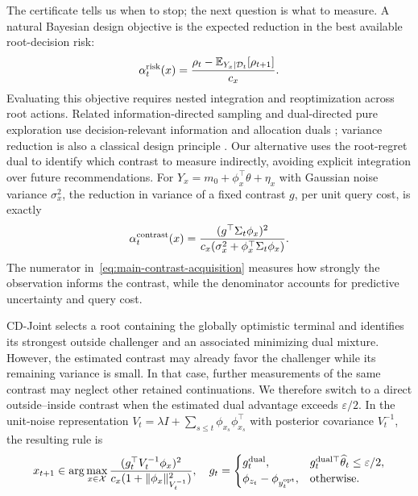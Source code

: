 \documentclass{article}
\theoremstyle{plain}
\theoremstyle{definition}
\begin{document}
The certificate tells us when to stop; the next question is
what to measure. A natural Bayesian design objective is the
expected reduction in the best available root-decision risk:
\begin{equation}
 \alpha_t^{\rm risk}(x)
 =\frac{\rho_t-\mathbb E_{Y_x\mid\mathcal D_t}
 [\rho_{t+1}]}{c_x}.
 \label{eq:main-risk-acquisition}
\end{equation}
Evaluating this objective requires nested integration and
reoptimization across root actions. Related information-directed
sampling and dual-directed pure exploration use decision-relevant
information and allocation duals
\citep{russo2018ids,kirschner2020ids,qin2026dual};
variance reduction is also a classical design principle
\citep{bogunovic2016truvar}. Our alternative uses the root-regret
dual to identify which contrast to measure indirectly, avoiding
explicit integration over future recommendations.
For $Y_x=m_0+\phi_x^\top\theta+\eta_x$ with Gaussian noise
variance $\sigma_x^2$, the reduction in variance of a fixed
contrast $g$, per unit query cost, is exactly
\begin{equation}
 \alpha_t^{\rm contrast}(x)
 =\frac{(g^\top\Sigma_t\phi_x)^2}
 {c_x(\sigma_x^2+\phi_x^\top\Sigma_t\phi_x)}.
 \label{eq:main-contrast-acquisition}
\end{equation}
The numerator in~\eqref{eq:main-contrast-acquisition}
measures how strongly the observation informs the contrast,
while the denominator accounts for predictive uncertainty
and query cost.

CD-Joint selects a root containing the globally optimistic
terminal and identifies its strongest outside challenger and
an associated minimizing dual mixture. However, the estimated
contrast may already favor the challenger while its remaining
variance is small. In that case, further measurements of
the same contrast may neglect other retained continuations.
We therefore switch to a direct outside--inside contrast
when the estimated dual advantage exceeds $\varepsilon/2$.
In the unit-noise representation
$V_t=\lambda I+\sum_{s\le t}\phi_{x_s}\phi_{x_s}^\top$
with posterior covariance $V_t^{-1}$, the resulting rule is
\begin{equation}
 x_{t+1}\in\arg\max_{x\in\mathcal X}
 \frac{(g_t^\top V_t^{-1}\phi_x)^2}
 {c_x(1+\|\phi_x\|_{V_t^{-1}}^2)},\quad
 g_t=\begin{cases}
 g_t^{\rm dual},
 &g_t^{{\rm dual}\top}\widehat\theta_t\le\varepsilon/2,\\
 \phi_{z_t}-\phi_{y_t^{\rm opt}},
 &\text{otherwise.}
 \end{cases}
 \label{eq:safeguard}
\end{equation}
\end{document}

